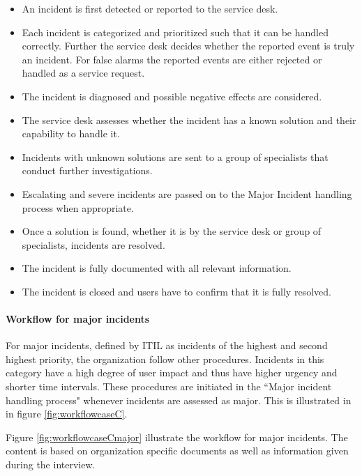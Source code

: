 \begin{itemize}
\item An incident is first detected or reported to the service desk.
\item Each incident is categorized and prioritized such that it can be handled correctly. Further the service desk decides whether the reported event is truly an incident. For false alarms the reported events are either rejected or handled as a service request.
\item The incident is diagnosed and possible negative effects are considered.
\item The service desk assesses whether the incident has a known solution and their capability to handle it.
\item Incidents with unknown solutions are sent to a group of specialists that conduct further investigations.
\item Escalating and severe incidents are passed on to the Major Incident handling process when appropriate. 
\item Once a solution is found, whether it is by the service desk or group of specialists, incidents are resolved.
\item The incident is fully documented with all relevant information.
\item The incident is closed and users have to confirm that it is fully resolved. 
\end{itemize}

\paragraph{Workflow for major incidents}
For major incidents, defined by ITIL as incidents of the highest and second highest priority, the organization follow other procedures. Incidents in this category have a high degree of user impact and thus have higher urgency and shorter time intervals. These procedures are initiated in the ``Major incident handling process" whenever incidents are assessed as major. This is illustrated in in figure \ref{fig:workflowcaseC}.  

Figure \ref{fig:workflowcaseCmajor} illustrate the workflow for major incidents. The content is based on organization specific documents as well as information given during the interview.

